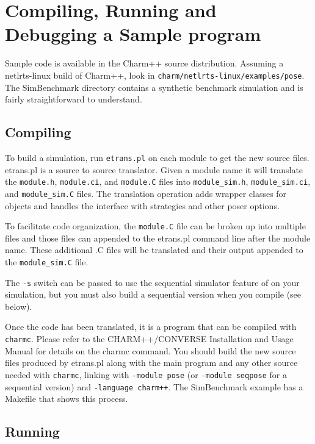 \section{Compiling, Running and Debugging a Sample \pose{} program}

Sample code is available in the Charm++ source distribution.  Assuming a
netlrts-linux build of Charm++, look in {\tt charm/netlrts-linux/examples/pose}.
The SimBenchmark directory contains a synthetic benchmark simulation and is
fairly straightforward to understand.

\subsection{Compiling}

To build a \pose{} simulation, run {\tt etrans.pl} on each \pose{}
module to get the new source files.  {etrans.pl} is a source to source
translator.  Given a module name it will translate the {\tt module.h},
{\tt module.ci}, and {\tt module.C} files into {\tt module\_sim.h},
{\tt module\_sim.ci}, and {\tt module\_sim.C} files.  The translation
operation adds wrapper classes for \pose{} objects and handles the
interface with strategies and other poser options.

To facilitate code organization, the {\tt module.C} file can be broken
up into multiple files and those files can appended to the {etrans.pl}
command line after the module name.  These additional .C files will be
translated and their output appended to the {\tt module\_sim.C} file.

The {\tt -s} switch can be passed to use the sequential simulator feature
of \pose{} on your simulation, but you must also build a sequential
version when you compile (see below).

Once the code has been translated, it is a \charmpp{} program that can
be compiled with {\tt charmc}.  Please refer to the CHARM++/CONVERSE
Installation and Usage Manual for details on the charmc command.  You
should build the new source files produced by etrans.pl along with the
main program and any other source needed with {\tt charmc}, linking
with {\tt -module pose} (or {\tt -module seqpose} for a sequential
version) and {\tt -language charm++}.  The SimBenchmark example has a
Makefile that shows this process.

\subsection{Running} 

